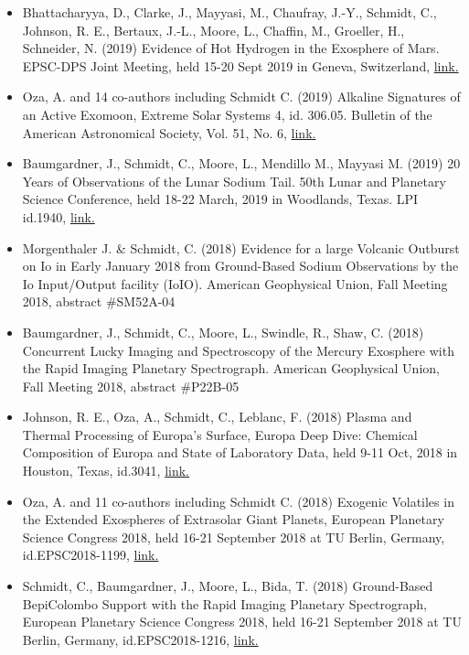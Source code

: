 \documentclass[12pt]{report}
\begin{document}
\begin{itemize}
   \item Bhattacharyya, D., Clarke, J., Mayyasi, M., Chaufray, J.-Y., Schmidt, C., Johnson, R. E., Bertaux, J.-L., Moore, L., Chaffin, M., Groeller, H., Schneider, N. (2019) Evidence of Hot Hydrogen in the Exosphere of Mars. EPSC-DPS Joint Meeting, held 15-20 Sept 2019 in Geneva, Switzerland, \href{https://meetingorganizer.copernicus.org/EPSC-DPS2019/EPSC-DPS2019-960-1.pdf}{link.}
   \item Oza, A. and 14 co-authors including Schmidt C. (2019) Alkaline Signatures of an Active Exomoon, Extreme Solar Systems 4, id. 306.05. Bulletin of the American Astronomical Society, Vol. 51, No. 6, \href{https://113qx216in8z1kdeyi404hgf-wpengine.netdna-ssl.com/wp-content/uploads/2019/09/exss4_abstracts.pdf#abs306.05}{link.}
   \item Baumgardner, J., Schmidt, C., Moore, L., Mendillo M., Mayyasi M. (2019) 20 Years of Observations of the Lunar Sodium Tail. 50th Lunar and Planetary Science Conference, held 18-22 March, 2019 in Woodlands, Texas. LPI id.1940, \href{https://www.hou.usra.edu/meetings/lpsc2019/pdf/1940.pdf}{link.}
   \item Morgenthaler J. \& Schmidt, C. (2018) Evidence for a large Volcanic Outburst on Io in Early January 2018 from Ground-Based Sodium Observations by the Io Input/Output facility (IoIO). American Geophysical Union, Fall Meeting 2018, abstract \#SM52A-04
   \item Baumgardner, J., Schmidt, C., Moore, L., Swindle, R., Shaw, C. (2018) Concurrent Lucky Imaging and Spectroscopy of the Mercury Exosphere with the Rapid Imaging Planetary Spectrograph. American Geophysical Union, Fall Meeting 2018, abstract \#P22B-05
   \item Johnson, R. E., Oza, A., Schmidt, C., Leblanc, F. (2018) Plasma and Thermal Processing of Europa's Surface, Europa Deep Dive: Chemical Composition of Europa and State of Laboratory Data, held 9-11 Oct, 2018 in Houston, Texas, id.3041, \href{https://www.hou.usra.edu/meetings/europadeepdive2018/pdf/3041.pdf}{link.} 
   \item Oza, A. and 11 co-authors including Schmidt C. (2018) Exogenic Volatiles in the Extended Exospheres of Extrasolar Giant Planets, European Planetary Science Congress 2018, held 16-21 September 2018 at TU Berlin, Germany, id.EPSC2018-1199, \href{https://meetingorganizer.copernicus.org/EPSC2018/EPSC2018-1199-2.pdf}{link.} 
   \item Schmidt, C., Baumgardner, J., Moore, L., Bida, T. (2018) Ground-Based BepiColombo Support with the Rapid Imaging Planetary Spectrograph, European Planetary Science Congress 2018, held 16-21 September 2018 at TU Berlin, Germany, id.EPSC2018-1216, \href{https://meetingorganizer.copernicus.org/EPSC2018/EPSC2018-1216-2.pdf}{link.} 

\end{itemize}
\end{document}
